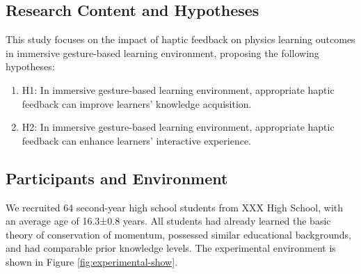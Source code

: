 \documentclass[runningheads]{llncs}
\begin{document}
\subsection{Research Content and Hypotheses}
This study focuses on the impact of haptic feedback on physics learning outcomes in immersive gesture-based learning environment, proposing the following hypotheses:

\begin{enumerate}[label={$\bullet$}]
 \item H1: In immersive gesture-based learning environment, appropriate haptic feedback can improve learners' knowledge acquisition.
 \item H2: In immersive gesture-based learning environment, appropriate haptic feedback can enhance learners' interactive experience.
\end{enumerate}

\subsection{Participants and Environment}

We recruited 64 second-year high school students from XXX High School, with an average age of 16.3±0.8 years. All students had already learned the basic theory of conservation of momentum, possessed similar educational backgrounds, and had comparable prior knowledge levels. The experimental environment is shown in Figure \ref{fig:experimental-show}.
\end{document}
